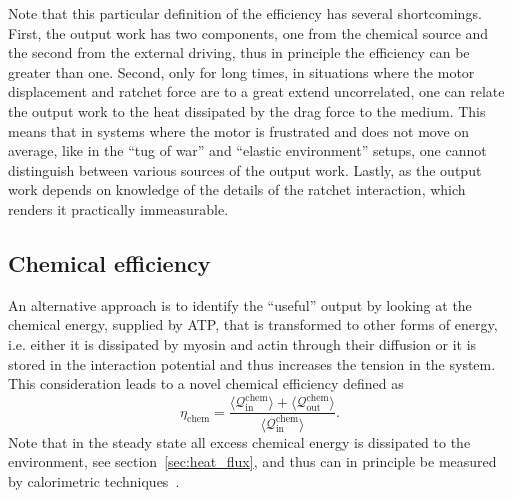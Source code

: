 \documentclass[aps,pre,twocolumn,showpacs,showkeys,superscriptaddress,floatfix]{revtex4-1}
\begin{document}
Note that this particular definition of the efficiency has several shortcomings.
First, the output work has two components, one from the chemical source and the second from the external driving, 
thus in principle the efficiency can be greater than one. 
Second, 
only for long times, in situations where the motor displacement and ratchet force are to a great extend uncorrelated, 
one can relate the output work to the heat dissipated by the drag force to the medium.
This means that in systems where the motor is frustrated and does not move on average, 
like in the ``tug of war'' and ``elastic environment'' setups,
one cannot distinguish between various sources of the output work. 
Lastly, as the output work depends on knowledge of the details of the ratchet interaction, which renders it practically immeasurable.


\subsection{Chemical efficiency} 
\label{sec:chemical_efficiency}
An alternative approach is to identify the ``useful'' output by looking at the chemical energy, supplied by ATP, that is transformed to other forms of energy, 
i.e. either it is dissipated by myosin and actin through their diffusion or it is stored in the interaction potential and thus increases the tension in the system. 
This consideration leads to a novel chemical efficiency defined as 
\begin{equation}
\eta_\text{chem} = \frac{\langle\mathcal Q^\text{chem}_\text{in}\rangle+\langle\mathcal Q^\text{chem}_\text{out}\rangle}{\langle\mathcal Q^\text{chem}_\text{in}\rangle} .
\label{eq:efficiency}
\end{equation}
Note that in the steady state all excess chemical energy is dissipated to the environment, see section~\ref{sec:heat_flux}, 
and thus can in principle be measured by calorimetric techniques~\cite{Maskow2015}.  
\end{document}
